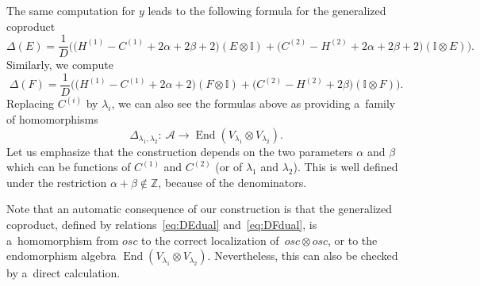 \documentclass[10pt,a4paper]{amsart}
\numberwithin{equation}{section}
\theoremstyle{definition}
\begin{document}
The same computation for $y$ leads to the following formula for the generalized coproduct
\begin{equation}\label{eq:DEdual}
 \Delta(E)=\frac{1}{D}\bigl(\bigl(H^{(1)} -C^{(1)}+2\alpha+2\beta+2\bigr)(E\otimes \mathbb{I})+\bigl(C^{(2)} -H^{(2)}+2\alpha+2\beta+2\bigr)(\mathbb{I}\otimes E)\bigr).
\end{equation}
Similarly, we compute
\begin{equation}\label{eq:DFdual}
\Delta(F)=\frac{1}{D}\bigl(\bigl(H^{(1)}-C^{(1)}+2\alpha+2\bigr)(F\otimes \mathbb{I})+\bigl(C^{(2)}-H^{(2)}+2\beta\bigr)(\mathbb{I}\otimes F)\bigr).\end{equation}
 Replacing $C^{(i)}$ by $\lambda_i$, we can also see the formulas above as providing a~family of homomorphisms
\[\Delta_{\lambda_1,\lambda_2}\colon\ \mathcal{A} \to \operatorname{End}(V_{\lambda_1}\otimes V_{\lambda_2}) .\]
Let us emphasize that the construction depends on the two parameters $\alpha$ and $\beta$ which can be functions of $C^{(1)}$ and $C^{(2)}$ (or of $\lambda_1$ and $\lambda_2$). This is well defined under the restriction $\alpha+\beta\notin\mathbb{Z}$, because of the denominators.


Note that an automatic consequence of our construction is that the generalized coproduct, defined by relations~\eqref{eq:DEdual} and~\eqref{eq:DFdual}, is a~homomorphism from $osc$ to the correct localization of~$osc \otimes osc$, or to the endomorphism algebra $\operatorname{End}(V_{\lambda_1}\otimes V_{\lambda_2})$. Nevertheless, this can also be checked by a~direct calculation.
\end{document}
